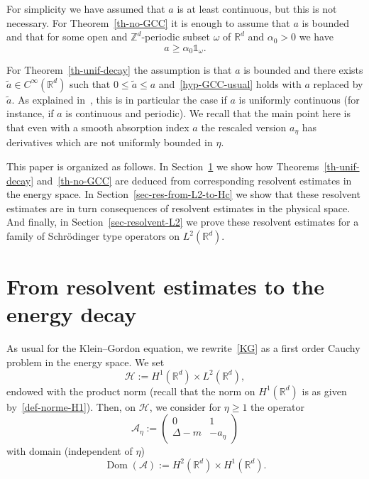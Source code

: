 \documentclass[10pt]{amsart}
\theoremstyle{definition}\newtheorem{defi}[theo]{Definition}\newtheorem{rema}[theo]{Remark}\newtheorem{exam}[theo]{Example}\newtheorem{exem}[theo]{Example}\newtheorem{nota}[theo]{Notation}
\renewcommand{\leq}{\leqslant}
\renewcommand{\geq}{\geqslant}
\newcommand{\1}{\mathds 1}
\DeclareMathOperator{\Dom}{Dom}
\newcommand{\R}{\mathbb{R}}
\renewcommand{\a}{\alpha}
\newcommand{\D}{\Delta}
\renewcommand{\o}{\omega}
\newcommand{\Ac}{{\mathcal A}}
\newcommand{\HH}{\mathcal H}
\begin{document}
For simplicity we have assumed that $a$ is at least continuous, but this is not necessary. For Theorem~\ref{th-no-GCC} it is enough to assume that $a$ is bounded and that for some open and $\mathbb Z^d$-periodic subset $\o$ of $\R^d$ and $\a_0 > 0$ we have
\begin{equation}\label{hyp-minor-a}
a \geq \a_0 \1_{\o}.
\end{equation}

For Theorem~\ref{th-unif-decay} the assumption is that $a$ is bounded and there exists $\tilde a \in C^\infty(\R^d)$ such that $0 \leq \tilde a \leq a$ and~\eqref{hyp-GCC-usual} holds with $a$ replaced by $\tilde a$. As explained in~\cite{BurqJo}, this is in particular the case if $a$ is uniformly continuous (for instance, if $a$ is continuous and periodic). We recall that the main point here is that even with a smooth absorption index $a$ the rescaled version $a_\eta$ has derivatives which are not uniformly bounded in $\eta$.%

\goodbreak
This paper is organized as follows. In Section~\ref{sec-resolvent-to-time} we show how Theorems~\ref{th-unif-decay} and~\ref{th-no-GCC} are deduced from corresponding resolvent estimates in the energy space. In Section~\ref{sec-res-from-L2-to-Hc} we show that these resolvent estimates are in turn consequences of resolvent estimates in the physical space. And finally, in Section~\ref{sec-resolvent-L2} we prove these resolvent estimates for a family of Schr\"odinger type operators on $L^2(\R^d)$.


\section{From resolvent estimates to the energy decay} \label{sec-resolvent-to-time}

As usual for the Klein--Gordon equation, we rewrite~\eqref{KG} as a first order Cauchy problem in the energy space. We set
\[
\HH := H^1(\R^d) \times L^2(\R^d),
\]
endowed with the product norm (recall that the norm on $H^1(\R^d)$ is as given by~\eqref{def-norme-H1}). Then, on $\HH$, we consider for $\eta \geq 1$ the operator
\[
\Ac_\eta :=
\begin{pmatrix}
0 & 1 \\
\D - m & -a_\eta
\end{pmatrix}
\]
with domain (independent of $\eta$)
\[
\Dom(\Ac) := H^2(\R^d) \times H^1(\R^d).
\]
\end{document}
